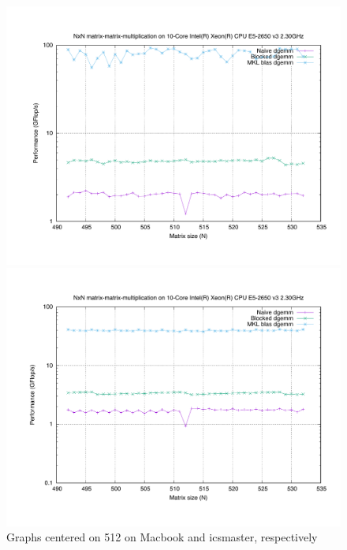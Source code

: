 \documentclass[unicode,11pt,a4paper,oneside,numbers=endperiod,openany]{scrartcl}
\begin{document}
\begin{enumerate}
            \begin{figure}[H]
                \begin{minipage}{.5\textwidth}
                    \centering
                    \includegraphics[width=\linewidth]{512_mac}
                \end{minipage}%
                \hfill
                \begin{minipage}{.5\textwidth}
                    \centering
                    \includegraphics[width=\linewidth]{512_icsmaster}
                \end{minipage}
                \caption{Graphs centered on 512 on Macbook and icsmaster, respectively}
                \label{c512}
            \end{figure}


\end{enumerate}
\end{document}
